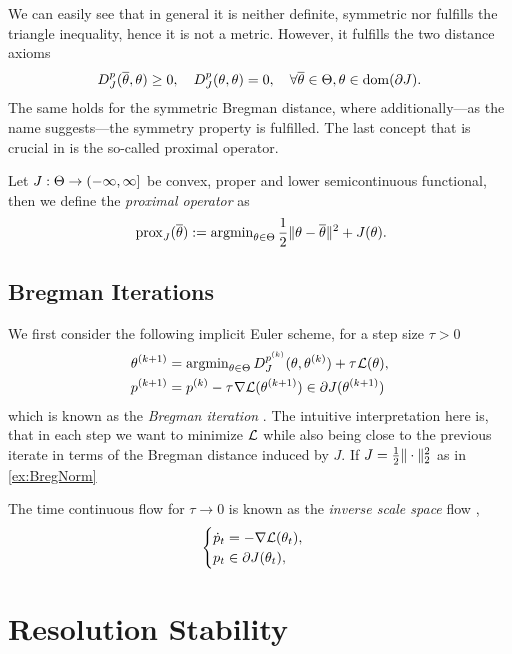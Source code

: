 %
We can easily see that in general it is neither definite, symmetric nor fulfills the triangle inequality, hence it is not a metric. 
However, it fulfills the two distance axioms
\begin{align}
D^p_J(\overline{\theta},\theta) \geq 0,\quad D^p_J(\theta,\theta)=0,\quad\forall\overline{\theta}\in\Theta,\theta\in\operatorname{dom}(\partial J).
\end{align}
%
The same holds for the symmetric Bregman distance, where additionally---as the name suggests---the symmetry property is fulfilled.
%
%
The last concept that is crucial in \cite{bungert2022bregman} is the so-called proximal operator.
%
\begin{definition}{}{}
Let $J:\Theta\to(-\infty,\infty]$  be convex, proper and lower semicontinuous functional, then we define the \emph{proximal operator} as
\begin{align}
    \,\mathrm{prox}_{J}(\overline{\theta}) := \operatorname{argmin}_{\theta\in\Theta} \frac{1}{2}\|\theta-\overline{\theta}\|^2 + J(\theta).
\end{align}
\end{definition}
%
%
\subsection{Bregman Iterations}
%
We first consider the following implicit Euler scheme, for a step size $\tau>0$
\begin{subequations}\label{eq:bregman_iteration}
\begin{align}
    \theta^{(k+1)} &= \operatorname{argmin}_{\theta\in\Theta} D^{p^{(k)}}_J(\theta,\theta^{(k)}) + \tau^{}\mathcal{L}(\theta), \\
    p^{(k+1)} &= p^{(k)} - \tau^{}\nabla\mathcal{L}(\theta^{(k+1)}) \in \partial J(\theta^{(k+1)})
\end{align}
\end{subequations}
%
which is known as the \emph{Bregman iteration} \cite{osher2005iterative}. The intuitive interpretation here is, that in each step we want to minimize $\mathcal{L}$ while also being close to the previous iterate in terms of the Bregman distance induced by $J$. If $J=\frac{1}{2}\|\cdot\|_2^2$ as in \cref{ex:BregNorm}


The time continuous flow for $\tau\to 0$ is known as the \emph{inverse scale space} flow \cite{burger2006nonlinear,burger2007inverse},
%
\begin{align*}
    \begin{cases}
        \dot{p}_t = - \nabla\mathcal{L}(\theta_t), \\
        p_t \in \partial J(\theta_t),
    \end{cases}
\end{align*}
%
\section{Resolution Stability}
%

